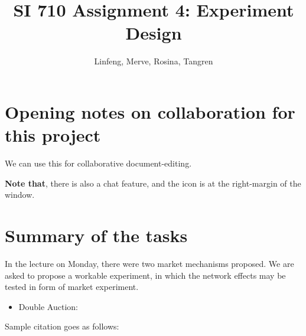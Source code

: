 \documentclass{article}
\title{SI 710 Assignment 4: Experiment Design}
\author{Linfeng, Merve, Rosina, Tangren}
\date{}
\begin{document}
\maketitle
\section{Opening notes on collaboration for this project}%

We can use this for collaborative document-editing.

\textbf{Note that}, there is also a chat feature, and the icon is at the right-margin of the window.

\section{Summary of the tasks}

In the lecture on Monday, there were two market mechanisms proposed. We are asked to propose a workable experiment, in which the network effects may be tested in form of market experiment.
\begin{itemize}
    \item Double Auction: 
\end{itemize}



Sample citation goes as follows: \cite{adams1995hitchhiker}




\end{document}
